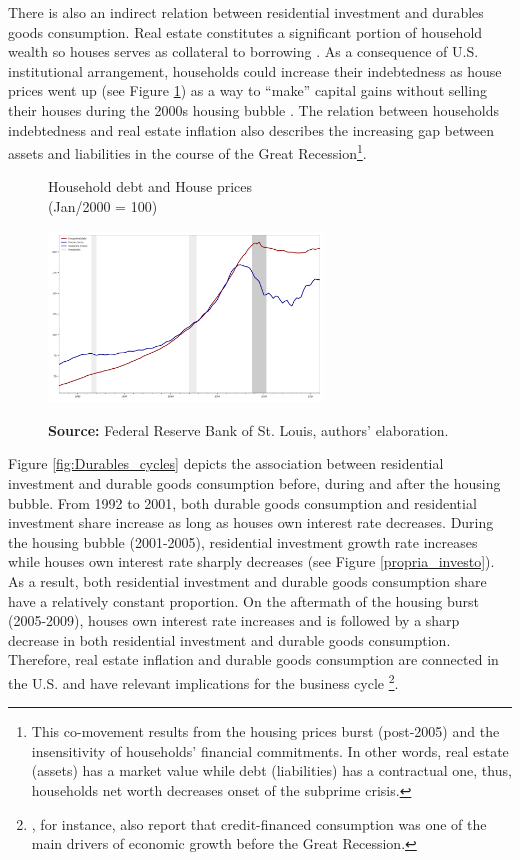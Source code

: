 \documentclass[11pt]{article}
\begin{document}
There is also an indirect relation between residential investment and durables goods consumption. Real estate constitutes a significant portion of household wealth so houses serves as collateral to borrowing \cite{teixeira_uma_2011}. 
As a consequence of U.S. institutional arrangement, households could increase their indebtedness as house
prices went up (see Figure \ref{fig:debt}) as a way to ``make'' capital gains without selling their houses during the 2000s housing bubble \cite{teixeira_crescimento_2015,hay_failure_2013}. 
The relation between households indebtedness and real estate inflation also describes the increasing gap between assets and liabilities in the course of the Great Recession\footnote{This co-movement results from the housing prices burst (post-2005) and  the insensitivity of households’ financial commitments. In other words, real estate (assets) has a market value while debt (liabilities) has a contractual one, thus, households net worth decreases
onset of the subprime crisis.}. 

\begin{figure}[htb]
    \centering
        \caption{Household debt and House prices\\\centering (Jan/2000 = 100)} 
    \includegraphics[width = 0.65\textwidth]{./figs/Debt_Prices.png}
    \label{fig:debt}
    \caption*{\textbf{Source:} Federal Reserve Bank of St. Louis, authors’ elaboration.}
\end{figure}



Figure \ref{fig:Durables_cycles} depicts the association between residential investment and durable goods consumption before, during and after the housing bubble.
From 1992 to 2001, both durable goods consumption and residential investment share increase as long as houses own interest rate decreases.
During the housing bubble (2001-2005), residential investment growth rate increases while houses own interest rate sharply decreases (see Figure \ref{propria_investo}).
As a result, both residential investment and durable goods consumption share have a relatively constant proportion.
On the aftermath of the housing burst (2005-2009), houses own interest rate increases and is followed by a sharp decrease in both residential investment and durable goods consumption.
Therefore, real estate inflation and durable goods consumption are connected in the U.S. and have relevant implications for the business cycle \footnote{\textcites{zezza_u.s._2008}{barba_rising_2009}, for instance, also report that credit-financed consumption was one of the main drivers of economic growth before the Great Recession.}. 
\end{document}
